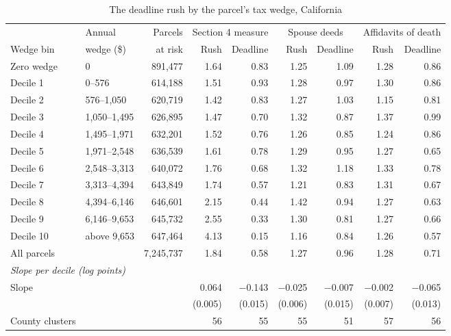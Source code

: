 \begin{table}[!ht]\centering
\caption{The deadline rush by the parcel's tax wedge, California}
\label{tab:s4gradient}
{\small
\begin{adjustbox}{max width = \textwidth}
\begin{tabular}{llrrrrrrr}
\toprule
 & Annual & Parcels & \multicolumn{2}{c}{Section 4 measure} & \multicolumn{2}{c}{Spouse deeds} & \multicolumn{2}{c}{Affidavits of death} \\
\cmidrule(lr){4-5}\cmidrule(lr){6-7}\cmidrule(lr){8-9}
Wedge bin & wedge (\$) & at risk & Rush & Deadline & Rush & Deadline & Rush & Deadline \\
\midrule
Zero wedge & 0 & 891,477 & 1.64 & 0.83 & 1.25 & 1.09 & 1.28 & 0.86 \\
Decile 1 & 0--576 & 614,188 & 1.51 & 0.93 & 1.28 & 0.97 & 1.30 & 0.86 \\
Decile 2 & 576--1,050 & 620,719 & 1.42 & 0.83 & 1.27 & 1.03 & 1.15 & 0.81 \\
Decile 3 & 1,050--1,495 & 626,895 & 1.47 & 0.70 & 1.32 & 0.87 & 1.37 & 0.99 \\
Decile 4 & 1,495--1,971 & 632,201 & 1.52 & 0.76 & 1.26 & 0.85 & 1.24 & 0.86 \\
Decile 5 & 1,971--2,548 & 636,539 & 1.61 & 0.78 & 1.29 & 0.95 & 1.27 & 0.65 \\
Decile 6 & 2,548--3,313 & 640,072 & 1.76 & 0.68 & 1.32 & 1.18 & 1.33 & 0.78 \\
Decile 7 & 3,313--4,394 & 643,849 & 1.74 & 0.57 & 1.21 & 0.83 & 1.31 & 0.67 \\
Decile 8 & 4,394--6,146 & 646,601 & 2.15 & 0.44 & 1.42 & 0.94 & 1.27 & 0.63 \\
Decile 9 & 6,146--9,653 & 645,732 & 2.55 & 0.33 & 1.30 & 0.81 & 1.27 & 0.66 \\
Decile 10 & above 9,653 & 647,464 & 4.13 & 0.15 & 1.16 & 0.84 & 1.26 & 0.57 \\
\addlinespace
All parcels &  & 7,245,737 & 1.84 & 0.58 & 1.27 & 0.96 & 1.28 & 0.71 \\
\midrule
\multicolumn{9}{l}{\emph{Slope per decile (log points)}} \\
Slope &  &  & 0.064 & $-$0.143 & $-$0.025 & $-$0.007 & $-$0.002 & $-$0.065 \\
 &  &  & (0.005) & (0.015) & (0.006) & (0.015) & (0.007) & (0.013) \\
County clusters &  &  & 56 & 55 & 55 & 51 & 57 & 56 \\
\bottomrule
\end{tabular}

\end{adjustbox}}
\end{table}
